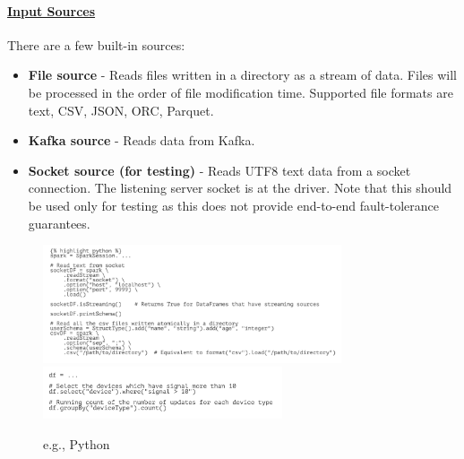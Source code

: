 \documentclass[10pt,a4paper]{article}
\begin{document}
 \paragraph{\uline{Input Sources}}
 There are a few built-in sources:
 \begin{itemize}
 	\item \textbf{File source} - Reads files written in a directory as a stream of data. Files will be processed in the order of file modification time. Supported file formats are text, CSV, JSON, ORC, Parquet. 
	\item \textbf{Kafka source} - Reads data from Kafka. 

	\item \textbf{Socket source (for testing)} - Reads UTF8 text data from a socket connection. The listening server socket is at the driver. Note that this should be used only for testing as this does not provide end-to-end fault-tolerance guarantees.
 \end{itemize}
      \begin{figure}[ht!]
 \hfill \includegraphics[width=250pt]{images/spark-streaming-ex}
 \hspace*{\fill}
 \center  
 \hfill \includegraphics[width=200pt]{images/spark-streaming-ex-2}
 \hspace*{\fill}
 \caption{e.g., Python}
 \end{figure}
 \raggedright
\end{document}
